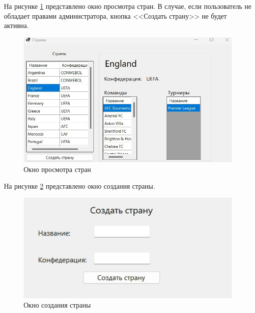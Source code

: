 На рисунке \ref{img:cou} представлено окно просмотра стран. В случае, если пользователь не обладает правами администратора, кнопка <<Создать страну>> не будет активна.
\begin{figure}
  \centering
  \includegraphics[scale=0.5]{inc/countries.jpg}
  \caption{Окно просмотра стран}
  \label{img:cou}
\end{figure}
На рисунке \ref{img:couc} представлено окно создания страны.
\begin{figure}
  \centering
  \includegraphics[scale=0.5]{inc/countrycr.jpg}
  \caption{Окно создания страны}
  \label{img:couc}
\end{figure}

